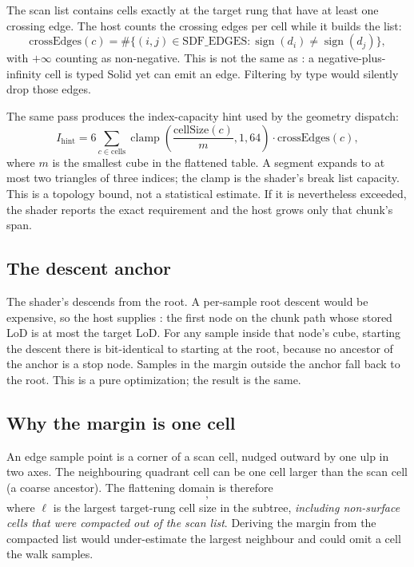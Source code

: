 The scan list contains cells exactly at the target rung that have at least
one crossing edge.  The host counts the crossing edges per cell while it
builds the list:
\begin{equation}
  \text{crossEdges}(c) =
  \#\{(i,j)\in\text{SDF\_EDGES} :
      \operatorname{sign}(d_i)\ne\operatorname{sign}(d_j)\},
\end{equation}
with $+\infty$ counting as non-negative.  This is not the same as
: a negative-plus-infinity cell is typed Solid yet
can emit an edge.  Filtering by type would silently drop those edges.

The same pass produces the index-capacity hint used by the geometry
dispatch:
\begin{equation}
  I_{\text{hint}} =
  6 \sum_{c\in\text{cells}}
      \operatorname{clamp}\!\left(
        \frac{\text{cellSize}(c)}{m},1,64\right)
      \cdot\text{crossEdges}(c),
\end{equation}
where $m$ is the smallest cube in the flattened table.  A segment expands
to at most two triangles of three indices; the clamp is the shader's break
list capacity.  This is a topology bound, not a statistical estimate.  If
it is nevertheless exceeded, the shader reports the exact requirement and
the host grows only that chunk's span.

\subsection{The descent anchor}

The shader's  descends from the root.  A per-sample root
descent would be expensive, so the host supplies : the first
node on the chunk path whose stored LoD is at most the target LoD.  For any
sample inside that node's cube, starting the descent there is
bit-identical to starting at the root, because no ancestor of the anchor
is a stop node.  Samples in the margin outside the anchor fall back to the
root.  This is a pure optimization; the result is the same.

\subsection{Why the margin is one cell}

An edge sample point is a corner of a scan cell, nudged outward by one ulp
in two axes.  The neighbouring quadrant cell can be one cell larger than
the scan cell (a coarse ancestor).  The flattening domain is therefore
\begin{equation}
  [\mathbf{c}_{\min}-\ell,\; \mathbf{c}_{\max}+\ell],
\end{equation}
where $\ell$ is the largest target-rung cell size in the subtree,
\emph{including non-surface cells that were compacted out of the scan
list}.  Deriving the margin from the compacted list would under-estimate
the largest neighbour and could omit a cell the walk samples.

